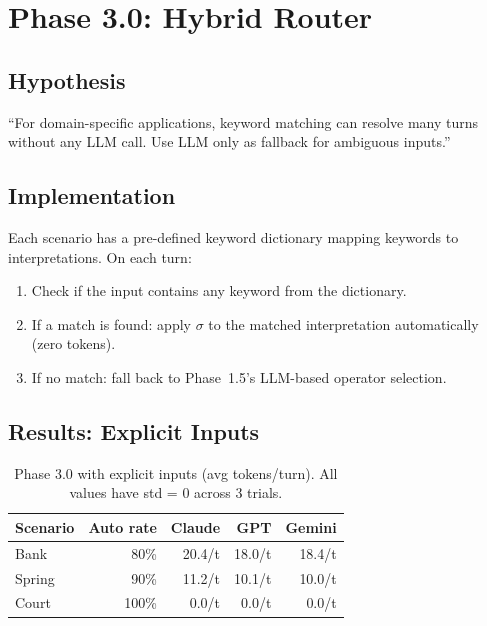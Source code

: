 \documentclass[11pt,a4paper]{article}
\begin{document}
\section{Phase 3.0: Hybrid Router}
\label{sec:phase3_0}

\subsection{Hypothesis}

``For domain-specific applications, keyword matching can resolve many turns
without any LLM call. Use LLM only as fallback for ambiguous inputs.''

\subsection{Implementation}

Each scenario has a pre-defined keyword dictionary mapping keywords to
interpretations. On each turn:
\begin{enumerate}
    \item Check if the input contains any keyword from the dictionary.
    \item If a match is found: apply $\sigma$ to the matched interpretation
    automatically (zero tokens).
    \item If no match: fall back to Phase~1.5's LLM-based operator selection.
\end{enumerate}

\subsection{Results: Explicit Inputs}

\begin{table}[ht]
\centering
\begin{tabular}{lrrrr}
\toprule
\textbf{Scenario} & \textbf{Auto rate} & \textbf{Claude} & \textbf{GPT} & \textbf{Gemini} \\
\midrule
Bank & 80\% & 20.4/t & 18.0/t & 18.4/t \\
Spring & 90\% & 11.2/t & 10.1/t & 10.0/t \\
Court & 100\% & 0.0/t & 0.0/t & 0.0/t \\
\bottomrule
\end{tabular}
\caption{Phase 3.0 with explicit inputs (avg tokens/turn). All values have
std = 0 across 3 trials.}
\label{tab:phase3_0_explicit}
\end{table}
\end{document}
